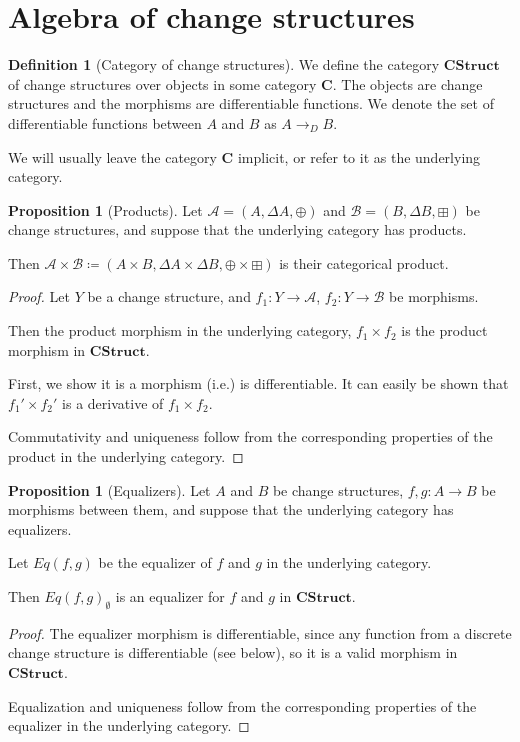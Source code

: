 \documentclass[english]{article}
\theoremstyle{plain}
\theoremstyle{definition}
\newtheorem{prop}[thm]{Proposition}
\theoremstyle{remark}
\theoremstyle{remark}
\theoremstyle{remark}
\theoremstyle{definition}
\newtheorem{defn}{Definition}
\newcommand{\defeq}{\coloneqq}
\newcommand{\cat}[1]{\mathbf{#1}}
\newcommand{\equalizer}[2]{Eq(#1, #2)}
\newcommand{\cplus}{\oplus}
\newcommand{\cpluss}{\boxplus}
\newcommand{\cstruct}[3]{(#1,#2,#3)}
\newcommand{\changes}[1]{\Delta #1}
\newcommand{\discrete}{\emptyset}
\newcommand{\derive}[1]{#1'}
\newcommand{\difffunc}{\rightarrow_{D}}
\begin{document}
\section{Algebra of change structures}

\begin{defn}[Category of change structures]
  We define the category $\cat{CStruct}$ of change structures over objects in
  some category $\cat{C}$. The objects are
  change structures and the morphisms are differentiable functions. We denote
  the set of differentiable functions between $A$ and $B$ as $A \difffunc B$.
  
  We will usually leave the category $\cat{C}$ implicit, or refer to it as the
  underlying category.
\end{defn}

\begin{prop}[Products]
  Let $\mathcal{A} = \cstruct{A}{\changes{A}}{\cplus}$ and $\mathcal{B} =
  \cstruct{B}{\changes{B}}{\cpluss}$ be change structures, and suppose that the
  underlying category has products.

  Then $\mathcal{A} \times \mathcal{B} \defeq \cstruct{A \times B}{\changes{A} \times
  \changes{B}}{\cplus \times \cpluss}$ is their categorical product.
\end{prop}
\begin{proof}
  Let $Y$ be a change structure, and $f_1: Y \rightarrow \mathcal{A}$, $f_2: Y
  \rightarrow \mathcal{B}$ be morphisms.

  Then the product morphism in the underlying category, $f_1 \times f_2$ is the product
  morphism in $\cat{CStruct}$.

  First, we show it is a morphism (i.e.) is differentiable. It can easily be
  shown that $\derive{f_1} \times \derive{f_2}$ is a derivative of $f_1 \times f_2$.

  Commutativity and uniqueness follow from the corresponding properties of the
  product in the underlying category.
\end{proof}

\begin{prop}[Equalizers]
  Let $A$ and $B$ be change structures, $f, g: A \rightarrow B$ be morphisms
  between them, and suppose that the underlying category has equalizers.

  Let $\equalizer{f}{g}$ be the equalizer of $f$ and $g$ in the underlying category.

  Then $\equalizer{f}{g}_\discrete$ is an equalizer for $f$ and $g$
  in $\cat{CStruct}$.
\end{prop}
\begin{proof}
  The equalizer morphism is differentiable, since any function from a discrete change
  structure is differentiable (see below), so it is a valid morphism in $\cat{CStruct}$.

  Equalization and uniqueness follow from the corresponding properties of the
  equalizer in the underlying category.
\end{proof}
\end{document}

